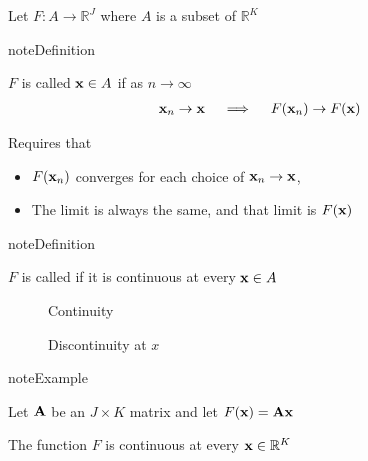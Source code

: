 \documentclass[letterpaper,10pt,english]{jupyterBook}
\begin{document}
\sphinxAtStartPar
Let \(F \colon A \to \mathbb{R}^J\) where \(A\) is a subset of \(\mathbb{R}^K\)

\begin{sphinxadmonition}{note}{Definition}

\sphinxAtStartPar
\(F\) is called  \({\bf x} \in A\) if as \(n \to \infty\)
\begin{equation*}
\begin{split}
{\bf x}_n \to {\bf x}
\quad \implies \quad
F({\bf x}_n) \to F({\bf x}) 
\end{split}
\end{equation*}\end{sphinxadmonition}

\sphinxAtStartPar
Requires that
\begin{itemize}
\item {} 
\sphinxAtStartPar
\(F({\bf x}_n)\) converges for each choice of \({\bf x}_n \to {\bf x}\),

\item {} 
\sphinxAtStartPar
The limit is always the same, and that limit is \(F({\bf x})\)

\end{itemize}

\begin{sphinxadmonition}{note}{Definition}

\sphinxAtStartPar
\(F\) is called  if it is continuous at every \({\bf x} \in
A\)
\end{sphinxadmonition}

\begin{figure}[htbp]
\centering
\capstart

\noindent{}
\caption{Continuity}\label{\detokenize{04.basic_analysis:cont-func}}\end{figure}

\begin{figure}[htbp]
\centering
\capstart

\noindent{}
\caption{Discontinuity at \(x\)}\label{\detokenize{04.basic_analysis:discont-func}}\end{figure}

\begin{sphinxadmonition}{note}{Example}

\sphinxAtStartPar
Let \({\bf A}\) be an \(J \times K\) matrix and let \(F({\bf x}) = {\bf A}
{\bf x}\)

\sphinxAtStartPar
The function \(F\) is continuous at every \({\bf x} \in \mathbb{R}^K\)
\end{sphinxadmonition}
\end{document}
